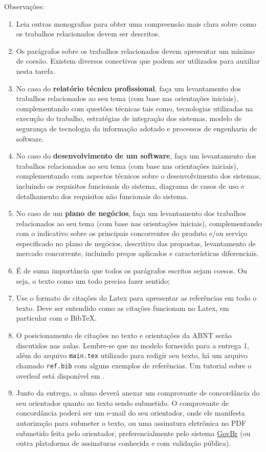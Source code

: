 \documentclass[
	12pt,				%
	openright,			%
	oneside,			%
	a4paper,			%
	chapter=TITLE,		%
	subsection=TITLE,	%
	english,			%
	brazil,				%
	]{abntex2}
\begin{document}
Observações:
\begin{enumerate}
    \item Leia outras monografias para obter uma compreensão mais clara sobre como os trabalhos relacionados devem ser descritos. 
    \item Os parágrafos sobre os trabalhos relacionados devem apresentar um mínimo de coesão. Existem diversos conectivos que podem ser utilizados para auxiliar nesta tarefa.
    \item No caso do \textbf{relatório técnico profissional}, faça um levantamento dos trabalhos relacionados ao seu tema (com base nas orientações iniciais), complementando com questões técnicas tais como, tecnologias utilizadas na execução do trabalho, estratégias de integração dos sistemas, modelo de segurança de tecnologia da informação adotado e processos de engenharia de software.
    \item No caso do \textbf{desenvolvimento de um software}, faça um levantamento dos trabalhos relacionados ao seu tema  (com base nas orientações iniciais), complementando com aspectos técnicos sobre o desenvolvimento dos sistemas, incluindo os requisitos funcionais do sistema, diagrama de casos de uso e detalhamento dos requisitos não funcionais  do sistema. 
    \item No caso de um \textbf{plano de negócios}, faça um levantamento dos trabalhos relacionados ao seu tema (com base nas orientações iniciais), complementando com o indicativo sobre os principais concorrentes do produto e/ou serviço especificado no plano de negócios, descritivo das propostas, levantamento de  mercado concorrente, incluindo preços aplicados e características diferenciais. 
    \item É de suma importância que todos os parágrafos escritos sejam coesos. Ou seja, o texto como um todo precisa fazer sentido;
    \item Use o formato de citações do Latex para apresentar as referências em todo o texto. Deve ser entendido como as citações funcionam no Latex, em particular com o BibTeX. 
    \item O posicionamento de citações no texto e orientações da ABNT serão discutidos nas aulas. Lembre-se que no modelo fornecido para a entrega 1, além do arquivo \texttt{main.tex} utilizado para redigir seu texto, há um arquivo chamado \texttt{ref.bib} com alguns exemplos de referências. Um tutorial sobre o overleaf está disponível em \cite{TutorialOverleaf}. 
    \item Junto da entrega, o aluno deverá anexar um comprovante de concordância do seu orientador quanto ao texto sendo submetido. O comprovante de concordância poderá ser um e-mail do seu orientador, onde ele manifesta autorização para submeter o texto, ou uma assinatura eletrônica no PDF submetido feita pelo orientador, preferencialmente pelo sistema \href{https://www.gov.br/governodigital/pt-br/identidade/assinatura-eletronica}{GovBr} (ou outra plataforma de assinaturas conhecida e com validação pública).
\end{enumerate}
\end{document}
